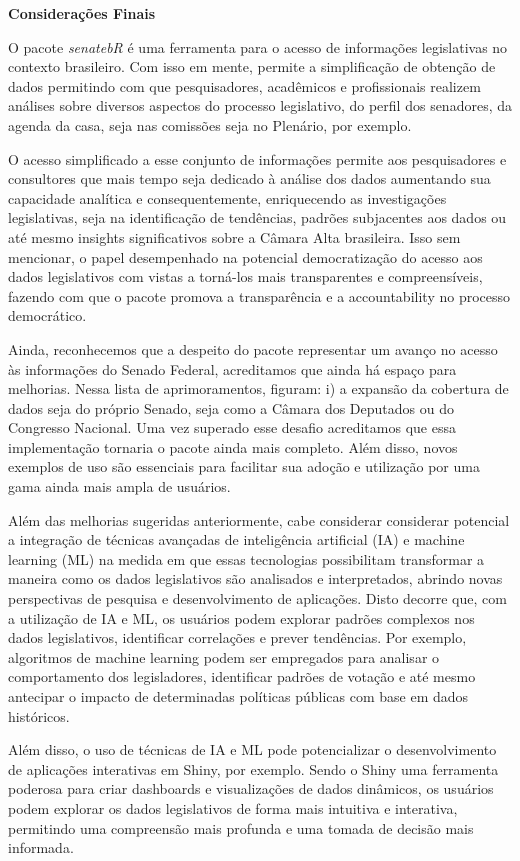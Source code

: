 \documentclass{article}
\begin{document}
\textbf{Considerações Finais}

O pacote \emph{senatebR} é uma ferramenta para o acesso de informações
legislativas no contexto brasileiro. Com isso em mente, permite a
simplificação de obtenção de dados permitindo com que pesquisadores,
acadêmicos e profissionais realizem análises sobre diversos aspectos do
processo legislativo, do perfil dos senadores, da agenda da casa, seja
nas comissões seja no Plenário, por exemplo.

O acesso simplificado a esse conjunto de informações permite aos
pesquisadores e consultores que mais tempo seja dedicado à análise dos
dados aumentando sua capacidade analítica e consequentemente,
enriquecendo as investigações legislativas, seja na identificação de
tendências, padrões subjacentes aos dados ou até mesmo insights
significativos sobre a Câmara Alta brasileira. Isso sem mencionar, o
papel desempenhado na potencial democratização do acesso aos dados
legislativos com vistas a torná-los mais transparentes e compreensíveis,
fazendo com que o pacote promova a transparência e a accountability no
processo democrático.

Ainda, reconhecemos que a despeito do pacote representar um avanço no
acesso às informações do Senado Federal, acreditamos que ainda há espaço
para melhorias. Nessa lista de aprimoramentos, figuram: i) a expansão da
cobertura de dados seja do próprio Senado, seja como a Câmara dos
Deputados ou do Congresso Nacional. Uma vez superado esse desafio
acreditamos que essa implementação tornaria o pacote ainda mais
completo. Além disso, novos exemplos de uso são essenciais para
facilitar sua adoção e utilização por uma gama ainda mais ampla de
usuários.

Além das melhorias sugeridas anteriormente, cabe considerar considerar
potencial a integração de técnicas avançadas de inteligência artificial
(IA) e machine learning (ML) na medida em que essas tecnologias
possibilitam transformar a maneira como os dados legislativos são
analisados e interpretados, abrindo novas perspectivas de pesquisa e
desenvolvimento de aplicações. Disto decorre que, com a utilização de IA
e ML, os usuários podem explorar padrões complexos nos dados
legislativos, identificar correlações e prever tendências. Por exemplo,
algoritmos de machine learning podem ser empregados para analisar o
comportamento dos legisladores, identificar padrões de votação e até
mesmo antecipar o impacto de determinadas políticas públicas com base em
dados históricos.

Além disso, o uso de técnicas de IA e ML pode potencializar o
desenvolvimento de aplicações interativas em Shiny, por exemplo. Sendo o
Shiny uma ferramenta poderosa para criar dashboards e visualizações de
dados dinâmicos, os usuários podem explorar os dados legislativos de
forma mais intuitiva e interativa, permitindo uma compreensão mais
profunda e uma tomada de decisão mais informada.
\end{document}
